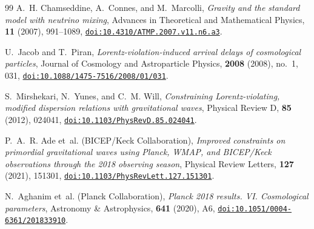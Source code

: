 \documentclass[11pt,a4paper,reqno]{amsart}
\theoremstyle{definition}
\numberwithin{equation}{section}
\providecommand{\doi}[1]{\href{https://doi.org/#1}{\nolinkurl{doi:#1}}}
\providecommand{\doi}[1]{\href{https://doi.org/#1}{\nolinkurl{doi:#1}}}
\begin{document}
\begin{thebibliography}{99}
A.~H. Chamseddine, A.~Connes, and M.~Marcolli,
\emph{Gravity and the standard model with neutrino mixing},
Advances in Theoretical and Mathematical Physics, \textbf{11} (2007), 991--1089,
\doi{10.4310/ATMP.2007.v11.n6.a3}.

U.~Jacob and T.~Piran,
\emph{Lorentz-violation-induced arrival delays of cosmological particles},
Journal of Cosmology and Astroparticle Physics, \textbf{2008} (2008), no.~1, 031,
\doi{10.1088/1475-7516/2008/01/031}.

S.~Mirshekari, N.~Yunes, and C.~M. Will,
\emph{Constraining Lorentz-violating, modified dispersion relations with gravitational waves},
Physical Review D, \textbf{85} (2012), 024041,
\doi{10.1103/PhysRevD.85.024041}.

P.~A.~R. Ade et~al. (BICEP/Keck Collaboration),
\emph{Improved constraints on primordial gravitational waves using Planck, WMAP, and BICEP/Keck observations through the 2018 observing season},
Physical Review Letters, \textbf{127} (2021), 151301,
\doi{10.1103/PhysRevLett.127.151301}.

N.~Aghanim et~al. (Planck Collaboration),
\emph{Planck 2018 results. VI. Cosmological parameters},
Astronomy \& Astrophysics, \textbf{641} (2020), A6,
\doi{10.1051/0004-6361/201833910}.

\end{thebibliography}
\end{document}
